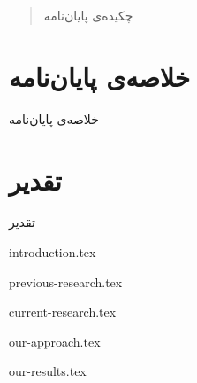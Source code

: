 \documentclass[a4paper,11px]{article}
\begin{document}
\begin{abstract}
چکیده‌ی پایان‌نامه
\end{abstract}
\newpage

\section*{
خلاصه‌ی پایان‌نامه
}

خلاصه‌ی پایان‌نامه
\newpage

\section*{
تقدیر
}

تقدیر
\newpage


\setcounter{secnumdepth}{2}
\setcounter{tocdepth}{2}
\tableofcontents

\newpage


\listoffigures

\newpage
 
 
\listoftables

\newpage

{introduction.tex}

\newpage


{previous-research.tex}

\newpage


{current-research.tex}

\newpage


{our-approach.tex}

\newpage



{our-results.tex}
\end{document}
